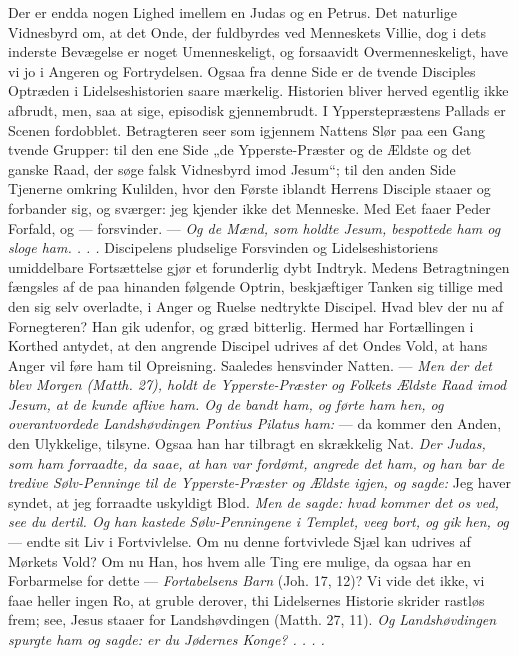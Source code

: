 \documentclass[12pt,a4paper]{book}
\begin{document}
Der er endda nogen Lighed imellem en Judas og en Petrus. Det naturlige Vidnesbyrd om, at
det Onde, der fuldbyrdes ved Menneskets Villie, dog i dets inderste Bevægelse er noget
Umenneskeligt, og forsaavidt Overmenneskeligt, have vi jo i Angeren og Fortrydelsen.
Ogsaa fra denne Side er de tvende Disciples Optræden i Lidelseshistorien saare mærkelig.
Historien bliver herved egentlig ikke afbrudt, men, saa at sige, episodisk gjennembrudt. I
Ypperstepræstens Pallads er Scenen fordobblet. Betragteren seer som igjennem Nattens Slør
paa een Gang tvende Grupper: til den ene Side „de Ypperste-Præster og de Ældste og det
ganske Raad, der søge falsk Vidnesbyrd imod Jesum“; til den anden Side Tjenerne omkring
Kulilden, hvor den Første iblandt Herrens Disciple staaer og forbander sig, og sværger:
jeg kjender ikke det Menneske. Med Eet faaer Peder Forfald, og --- forsvinder. ---
\emph{Og de Mænd, som holdte Jesum, bespottede ham og sloge ham. . . .} Discipelens
pludselige Forsvinden og Lidelseshistoriens umiddelbare Fortsættelse gjør et forunderlig
dybt Indtryk. Medens Betragtningen fængsles af de paa hinanden følgende Optrin,
beskjæftiger Tanken sig tillige med den sig selv overladte, i Anger og Ruelse nedtrykte
Discipel. Hvad blev der nu af Fornegteren? {\large Han gik udenfor, og græd bitterlig.}
Hermed har Fortællingen i Korthed antydet, at den angrende Discipel udrives af det Ondes
Vold, at hans Anger vil føre ham til Opreisning. Saaledes hensvinder Natten. ---
\emph{Men der det blev Morgen (Matth. 27), holdt de Ypperste-Præster
og Folkets Ældste Raad imod Jesum, at de kunde aflive ham. Og de bandt ham, og førte ham
hen, og overantvordede Landshøvdingen Pontius Pilatus ham:} --- da kommer den Anden, den
Ulykkelige, tilsyne. Ogsaa han har tilbragt en skrækkelig Nat. \emph{Der Judas, som ham
forraadte, da saae, at han var fordømt, angrede det ham, og han bar de tredive
Sølv-Penninge til de Ypperste-Præster og Ældste igjen, og sagde:} {\large Jeg haver
syndet, at jeg forraadte uskyldigt Blod.} \emph{Men de sagde: hvad kommer det os ved, see
du dertil. Og han kastede Sølv-Penningene i Templet, veeg bort, og gik hen, og} --- endte
sit Liv i Fortvivlelse. Om nu denne fortvivlede Sjæl kan udrives af Mørkets Vold? Om nu
Han, hos hvem alle Ting ere mulige, da ogsaa har en Forbarmelse for dette ---
\emph{Fortabelsens Barn} (Joh. 17, 12)? Vi vide det ikke, vi faae heller ingen Ro, at
gruble derover, thi Lidelsernes Historie skrider rastløs frem; see, Jesus staaer for
Landshøvdingen (Matth. 27, 11). \emph{Og Landshøvdingen spurgte ham og sagde: er du
Jødernes Konge? . . . .}
\end{document}
